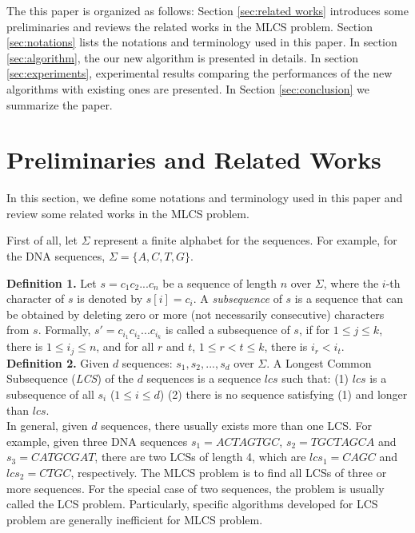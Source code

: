 \documentclass{article}
\begin{document}
The this paper is organized as follows: Section \ref{sec:related
  works} introduces some preliminaries and reviews the related works
in the MLCS problem. Section \ref{sec:notations} lists the notations
and terminology used in this paper. In section \ref{sec:algorithm},
the our new algorithm is presented in details. In section
\ref{sec:experiments}, experimental results comparing the performances
of the new algorithms with existing ones are presented. In Section
\ref{sec:conclusion} we summarize the paper.

\section{Preliminaries and Related Works}
\label{sec:related works}

In this section, we define some notations and terminology used in this
paper and review some related works in the MLCS problem.

First of all, let $\Sigma$ represent a finite alphabet for the
sequences.  For example, for the DNA sequences,
$\Sigma=\{A, C, T, G\}$.

\textbf{Definition 1.} Let $s=c_1c_2...c_n$ be a sequence of length
$n$ over $\Sigma$, where the $i$-th character of $s$ is denoted by
$s[i]=c_i$. A \emph{subsequence} of $s$ is a sequence that can be
obtained by deleting zero or more (not necessarily consecutive)
characters from $s$. Formally, $s'=c_{i_1}c_{i_2}...c_{i_k}$ is called
a subsequence of $s$, if for $1 \leq j \leq k$, there is
$1 \leq i_j \leq n$, and for all $r$ and $t$, $1 \leq r < t \leq k$,
there is $i_r < i_t$.\\

\textbf{Definition 2.} Given $d$ sequences: $s_1, s_2, ..., s_d$ over
$\Sigma$. A Longest Common Subsequence (\emph{LCS}) of the $d$
sequences is a sequence $lcs$ such that: (1) $lcs$ is a subsequence of
all $s_i$ ($1 \leq i \leq d$) (2) there is no sequence satisfying (1)
and longer than $lcs$.\\

In general, given $d$ sequences, there usually exists more than one
LCS. For example, given three DNA sequences $s_1 = ACTAGTGC$,
$s_2 = TGCTAGCA$ and $s_3 = CATGCGAT$, there are two LCSs of length 4,
which are $lcs_1 = CAGC$ and $lcs_2 = CTGC$, respectively. The MLCS
problem is to find all LCSs of three or more sequences. For the
special case of two sequences, the problem is usually called the LCS
problem. Particularly, specific algorithms developed for LCS problem
are generally inefficient for
MLCS problem.\\
\end{document}
